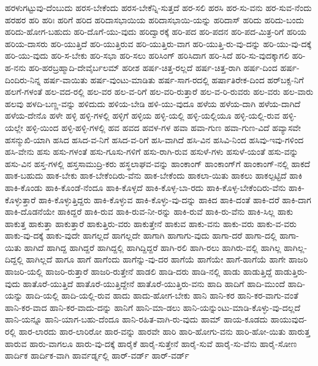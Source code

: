 {ಹರಳುಗಟ್ಟುವು-ದೆಂಬುದು
ಹರಸ-ಬೇಕೆಂದು
ಹರಸ-ಬೇಕೆನ್ನಿ-ಸುತ್ತದೆ
ಹರ-ಸಲಿ
ಹರಸಿ
ಹರ-ಸು-ವನು
ಹರ-ಸುವ-ನೆಂದು
ಹರಹರ
ಹರಿ
ಹರಿಃ
ಹರಿಗೆ
ಹರಿದ
ಹರಿದಾಸಭಾಯಿಯ
ಹರಿದಾಸಭಾಯಿ-ಯನ್ನು
ಹರಿದಾಸ್
ಹರಿದು
ಹರಿದು-ಬಂದು
ಹರಿದು-ಹೋಗ-ಬಹುದು
ಹರಿ-ದೊಗೆ-ಯು-ವುದು
ಹರಿದ್ವಾರಕ್ಕೆ
ಹರಿ-ಪದ
ಹರಿ-ಪದನ
ಹರಿ-ಪದ-ಮಿತ್ರ-ರಿಗೆ
ಹರಿಯ
ಹರಿಯ-ದಾಸರು
ಹರಿ-ಯುತ್ತಿದೆ
ಹರಿ-ಯುತ್ತಿರುವ
ಹರಿ-ಯುತ್ತಿರು-ವಾಗ
ಹರಿ-ಯುತ್ತಿ-ರು-ವು-ದನ್ನು
ಹರಿ-ಯು-ವು-ದಕ್ಕೆ
ಹರಿ-ಯು-ವುದು
ಹರಿ-ಸ-ಬೇಕು
ಹರಿ-ಸಭಾ
ಹರಿ-ಸಲು
ಹರಿಸಿಂಗ್
ಹರಿಸಿದಾಗ
ಹರಿ-ಸಿದೆ
ಹರಿ-ಸು-ವುದಕ್ಕಾಗಲಿ
ಹರಿ-ಹ-ನನು
ಹರಿ-ಹರಬ್ರಹ್ಮಾದಿ-ದೇವೈರ್ಬಲಮ್
ಹರೀಶ
ಹರ್ಷ-ಚಿತ್ತ-ರಲ್ಲದೆ
ಹರ್ಷ-ಚಿತ್ತ-ರಾಗಿ
ಹರ್ಷ-ದಿಂದ
ಹರ್ಷ-ದಿಂದಿರು-ನಿನ್ನ
ಹರ್ಷ-ವಾಯಿತು
ಹರ್ಷ-ವುಂಟು-ಮಾಡಿತು
ಹರ್ಷ-ಸಾಗ-ರದಲ್ಲಿ
ಹರ್ಷಾತಿರೇಕ-ದಿಂದ
ಹರ್‌ಬಕ್ಸ-ನಿಗೆ
ಹಲಗೆ-ಗಳಂತೆ
ಹಲ-ವದ-ರಲ್ಲಿ
ಹಲ-ವರ
ಹಲ-ವ-ರಿಗೆ
ಹಲ-ವರಿ-ರುತ್ತಾರೆ
ಹಲ-ವ-ರಿ-ರುವರು
ಹಲ-ವರು
ಹಲ-ವಾರು
ಹಲವು
ಹಳದಿ-ಬಣ್ಣ-ವನ್ನು
ಹಳಿದುದು
ಹಳಿಯ-ಬೇಡಿ
ಹಳಿ-ಯು-ವುದೂ
ಹಳೆಯ
ಹಳೆಯ-ದಾಗಿ
ಹಳೆಯ-ದಾಗಿದೆ
ಹಳೆಯ-ದೇನೊ
ಹಳೇ
ಹಳ್ಳಿ
ಹಳ್ಳಿ-ಗಳಲ್ಲಿ
ಹಳ್ಳಿಗೆ
ಹಳ್ಳಿಯ
ಹಳ್ಳಿ-ಯಲ್ಲಿ
ಹಳ್ಳಿ-ಯಲ್ಲಿಯೂ
ಹಳ್ಳಿ-ಯಲ್ಲಿ-ರುವ
ಹಳ್ಳಿ-ಯಲ್ಲೇ
ಹಳ್ಳಿ-ಯಿಂದ
ಹಳ್ಳಿ-ಹಳ್ಳಿ-ಗಳಲ್ಲಿ
ಹವ
ಹವದ
ಹವಳ-ಗಳ
ಹವಾ
ಹವಾ-ಗುಣ
ಹವಾ-ಗುಣ-ವಿದೆ
ಹವ್ಯಾಸವೇ
ಹಸನ್ಮುಖಿ-ಯಾಗಿ
ಹಸಿದ
ಹಸಿದ-ವ-ನಿಗೆ
ಹಸಿದ-ವ-ರಿಗೆ
ಹಸಿ-ವಾಗಿದೆ
ಹಸಿ-ವಿನ
ಹಸಿವಿ-ನಿಂದ
ಹಸಿವು-ಇವು-ಗಳಿಂದ
ಹಸಿ-ವೇನು
ಹಸು
ಹಸು-ಗಳಂತೆ
ಹಸು-ಗೂಸು-ಗಳಿಗೆ
ಹಸು-ರಾಗಿ-ರುವ
ಹಸುಳೆ-ಗಳು
ಹಸುಳೆ-ಯಂತೆ
ಹಸು-ವನ್ನು
ಹಸು-ವಿನ
ಹಸ್ತ-ಗಳಲ್ಲಿ
ಹಸ್ತಸಾಮುದ್ರಿ-ಕರು
ಹಸ್ಥಲಾಘವ-ವನ್ನು
ಹಾಂಕಾಂಗ್
ಹಾಂಕಾಂಗ್‌ಗೆ
ಹಾಂಕಾಂಗ್‌-ನಲ್ಲಿ
ಹಾಕದೆ
ಹಾಕ-ಬಹುದು
ಹಾಕ-ಬೇಕು
ಹಾಕ-ಬೇಕೆಂದಿರು-ವೆನು
ಹಾಕ-ಬೇಕೆಂದು
ಹಾಕಲಾ-ಯಿತು
ಹಾಕಲು
ಹಾಕಲ್ಪಟ್ಟಿದೆ
ಹಾಕಿ
ಹಾಕಿ-ಕೊಂಡು
ಹಾಕಿ-ಕೊಂಡೆ-ನೆಂದೂ
ಹಾಕಿ-ಕೊಳ್ಳದೆ
ಹಾಕಿ-ಕೊಳ್ಳ-ಬಾ-ರದು
ಹಾಕಿ-ಕೊಳ್ಳ-ಬೇಕೆಂದಿರು-ವೆನು
ಹಾಕಿ-ಕೊಳ್ಳುತ್ತಾರೆ
ಹಾಕಿ-ಕೊಳ್ಳುತ್ತಿದ್ದರು
ಹಾಕಿ-ಕೊಳ್ಳುವ
ಹಾಕಿ-ಕೊಳ್ಳು-ವು-ದನ್ನು
ಹಾಕಿದ
ಹಾಕಿ-ದಂತೆ
ಹಾಕಿ-ದರೆ
ಹಾಕಿ-ದಾಗ
ಹಾಕಿ-ದೊಡನೆಯೇ
ಹಾಕಿದ್ದರೆ
ಹಾಕಿ-ರುವ
ಹಾಕಿ-ರುವ-ನೀ-ರನ್ನು
ಹಾಕಿ-ರುವೆ
ಹಾಕಿ-ರು-ವೆನು
ಹಾಕಿ-ಸಿಲ್ಲ
ಹಾಕು
ಹಾಕುತ್ತ
ಹಾಕುತ್ತಾ
ಹಾಕುತ್ತಾರೆ
ಹಾಕುತ್ತಿರು-ವರು
ಹಾಕುತ್ತೇನೆ
ಹಾಕುವ
ಹಾಕು-ವನು
ಹಾಕು-ವರು
ಹಾಕು-ವ-ವರು
ಹಾಕು-ವು-ದಕ್ಕೆ
ಹಾಕು-ವುದೇ
ಹಾಗಲ್ಲದೆ
ಹಾಗಲ್ಲದೇ
ಹಾಗಾಗಿ
ಹಾಗಾಗು-ವುದು
ಹಾಗಾ-ದರೆ
ಹಾಗಾ-ದಲ್ಲಿ
ಹಾಗಾ-ಯಿತು
ಹಾಗಿದೆ
ಹಾಗಿದ್ದ
ಹಾಗಿದ್ದರೆ
ಹಾಗಿದ್ದಲ್ಲಿ
ಹಾಗಿದ್ದಿದ್ದರೆ
ಹಾಗಿ-ರಲಿ
ಹಾಗಿ-ರಲು
ಹಾಗಿರು-ವಲ್ಲಿ
ಹಾಗಿಲ್ಲ
ಹಾಗಿಲ್ಲ-ದಿದ್ದಲ್ಲಿ
ಹಾಗಿಲ್ಲದೆ
ಹಾಗೂ
ಹಾಗೆ
ಹಾಗೆಂದು
ಹಾಗೆನ್ನು-ವು-ದರ
ಹಾಗೆಯೆ
ಹಾಗೆಯೇ
ಹಾಗೆ-ಹಾಗೆಯೆ
ಹಾಗೇ
ಹಾಜರಿ
ಹಾಜರಿ-ಯಲ್ಲಿ
ಹಾಜರಿ-ರುತ್ತಾರೆ
ಹಾಜರಿ-ರುತ್ತೇನೆ
ಹಾಡಲಿ
ಹಾಡಿ-ದರು
ಹಾಡಿ-ನಲ್ಲಿ
ಹಾಡು
ಹಾಡುತ್ತಿದ್ದೆ
ಹಾಡುತ್ತಿರು-ವುದು
ಹಾತೊರೆ-ಯುತ್ತಿದೆ
ಹಾತೊರೆ-ಯುತ್ತಿದ್ದೇನೆ
ಹಾತೊರೆ-ಯುತ್ತಿರು-ವನು
ಹಾದಿ
ಹಾದಿಗೆ
ಹಾದಿ-ಮುಂದೆ
ಹಾದಿ-ಯನ್ನು
ಹಾದಿ-ಯಲ್ಲಿ
ಹಾದಿ-ಯಲ್ಲಿ-ರುವ
ಹಾದು
ಹಾದು-ಹೋಗ-ಬೇಕು
ಹಾನಿ
ಹಾನಿ-ಕರ
ಹಾನಿ-ಕರ-ವಾಗು-ವಂತೆ
ಹಾನಿ-ಕರ-ವಾದ
ಹಾನಿ-ಕರ-ವಾದು-ದನ್ನು
ಹಾನಿಗೆ
ಹಾನಿ-ಮಾ-ಡಲು
ಹಾನಿ-ಯನ್ನುಂಟು-ಮಾಡಿ-ಕೊಳ್ಳು-ವು-ದಲ್ಲದೆ
ಹಾನಿ-ಯನ್ನೂ
ಹಾನಿ-ಯಾಗ-ಬಹು-ದೆಂದೂ
ಹಾನಿ-ರಹಿತ-ವಾಗಿ-ರು-ವುದು
ಹಾಮ್
ಹಾಯ-ಕೂಡದು
ಹಾಯುವುದ-ರಲ್ಲಿ
ಹಾರ-ಲಾರದು
ಹಾರ-ಲಾರಿರೋ
ಹಾರ-ವನ್ನು
ಹಾರವೇ
ಹಾರಿ
ಹಾರಿ-ಹೋಗು-ವನು
ಹಾರಿ-ಹೋ-ಯಿತು
ಹಾರುತ್ತ
ಹಾರುವ
ಹಾರು-ವಾಗಲೂ
ಹಾರು-ವು-ದಕ್ಕೆ
ಹಾರೈಕೆ
ಹಾರೈ-ಸುತ್ತೇನೆ
ಹಾರೈ-ಸುವೆ
ಹಾರೈ-ಸು-ವೆನು
ಹಾರೈ-ಸೋಣ
ಹಾರ್ದಿಕ
ಹಾರ್ದಿಕ-ವಾಗಿ
ಹಾರ್ವರ್ಡ್ನಲ್ಲಿ
ಹಾರ್‌-ವರ್ಡ್
ಹಾರ್‌-ವರ್ಡ್‌
}
